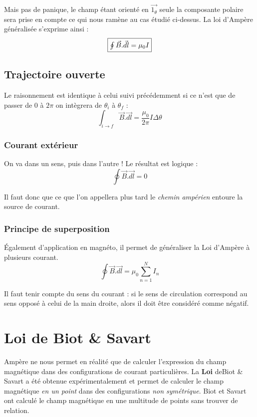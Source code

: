 \documentclass	[11pt, a4paper, openany]{book}
\begin{document}
Mais pas de panique, le champ étant orienté en $\vec{1_\theta}$ seule la composante polaire sera prise en compte ce qui nous ramène au cas étudié ci-dessus. 
La loi d'Ampère généralisée s'exprime ainsi :
\begin{equation}
\fbox{$\oint \vec{B}.\vec{dl} = \mu_0 I$}
\end{equation}


\subsection{Trajectoire ouverte}
Le raisonnement est identique à celui suivi précédemment si ce n'est que de passer de $0$ à $2\pi$ on intègrera de $\theta_i$ à $\theta_f$ :
\begin{equation}
\int_{i\rightarrow f} \vec{B}.\vec{dl} = \frac{\mu_0}{2\pi}I\Delta\theta
\end{equation}


\subsubsection{Courant extérieur}
On va dans un sens, puis dans l'autre ! Le résultat est logique :
\begin{equation}
\oint \vec{B}.\vec{dl} = 0
\end{equation}

Il faut donc que ce que l'on appellera plus tard le \textit{chemin ampérien} entoure la source de courant.

\subsubsection{Principe de superposition}
Également d'application en magnéto, il permet de généraliser la Loi d'Ampère à plusieurs courant.
\begin{equation}
\oint \vec{B}.\vec{dl} = \mu_0 \sum_{n=1}^N I_n
\end{equation}

Il faut tenir compte du sens du courant : si le sens de circulation correspond au sens opposé à celui de la main droite, alors il doit être considéré comme négatif.

\section{Loi de Biot \& Savart}
Ampère ne nous permet en réalité que de calculer l'expression du champ magnétique dans des configurations de courant particulières. La \textbf{Loi} deBiot \& Savart a été obtenue expérimentalement et permet de calculer le champ magnétique \textit{en un point} dans des configurations \textit{non symétrique}. Biot et Savart ont calculé le champ magnétique en une multitude de points sans trouver de relation. 
\end{document}
